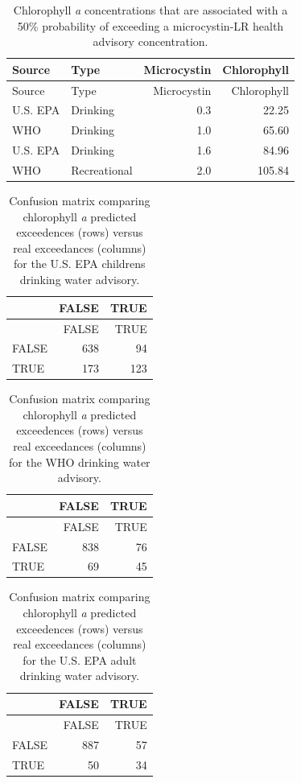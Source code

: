\documentclass[11pt,]{article}
\begin{document}
\newpage

\begin{longtable}[c]{@{}llrr@{}}
\caption{Chlorophyll \textit{a} concentrations that are associated with
a 50\% probability of exceeding a microcystin-LR health advisory
concentration. \label{tab:mc_chla_table}}\tabularnewline
\toprule
Source & Type & Microcystin & Chlorophyll\tabularnewline
\midrule
\endfirsthead
\toprule
Source & Type & Microcystin & Chlorophyll\tabularnewline
\midrule
\endhead
U.S. EPA & Drinking & 0.3 & 22.25\tabularnewline
WHO & Drinking & 1.0 & 65.60\tabularnewline
U.S. EPA & Drinking & 1.6 & 84.96\tabularnewline
WHO & Recreational & 2.0 & 105.84\tabularnewline
\bottomrule
\end{longtable}

\newpage

\begin{longtable}[c]{@{}lrr@{}}
\caption{Confusion matrix comparing chlorophyll \textit{a} predicted
exceedences (rows) versus real exceedances (columns) for the U.S. EPA
childrens drinking water advisory.
\label{tab:child_conmat_table}}\tabularnewline
\toprule
& FALSE & TRUE\tabularnewline
\midrule
\endfirsthead
\toprule
& FALSE & TRUE\tabularnewline
\midrule
\endhead
FALSE & 638 & 94\tabularnewline
TRUE & 173 & 123\tabularnewline
\bottomrule
\end{longtable}

\newpage

\begin{longtable}[c]{@{}lrr@{}}
\caption{Confusion matrix comparing chlorophyll \textit{a} predicted
exceedences (rows) versus real exceedances (columns) for the WHO
drinking water advisory.
\label{tab:who_drink_conmat_table}}\tabularnewline
\toprule
& FALSE & TRUE\tabularnewline
\midrule
\endfirsthead
\toprule
& FALSE & TRUE\tabularnewline
\midrule
\endhead
FALSE & 838 & 76\tabularnewline
TRUE & 69 & 45\tabularnewline
\bottomrule
\end{longtable}

\newpage

\begin{longtable}[c]{@{}lrr@{}}
\caption{Confusion matrix comparing chlorophyll \textit{a} predicted
exceedences (rows) versus real exceedances (columns) for the U.S. EPA
adult drinking water advisory.
\label{tab:adult_conmat_table}}\tabularnewline
\toprule
& FALSE & TRUE\tabularnewline
\midrule
\endfirsthead
\toprule
& FALSE & TRUE\tabularnewline
\midrule
\endhead
FALSE & 887 & 57\tabularnewline
TRUE & 50 & 34\tabularnewline
\bottomrule
\end{longtable}
\end{document}
